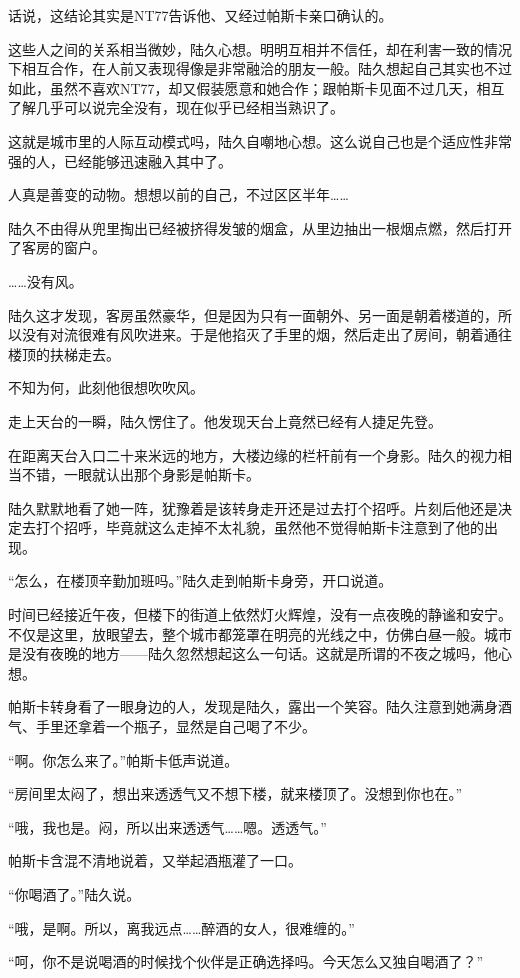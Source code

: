 话说，这结论其实是NT77告诉他、又经过帕斯卡亲口确认的。

这些人之间的关系相当微妙，陆久心想。明明互相并不信任，却在利害一致的情况下相互合作，在人前又表现得像是非常融洽的朋友一般。陆久想起自己其实也不过如此，虽然不喜欢NT77，却又假装愿意和她合作；跟帕斯卡见面不过几天，相互了解几乎可以说完全没有，现在似乎已经相当熟识了。

这就是城市里的人际互动模式吗，陆久自嘲地心想。这么说自己也是个适应性非常强的人，已经能够迅速融入其中了。

人真是善变的动物。想想以前的自己，不过区区半年……

陆久不由得从兜里掏出已经被挤得发皱的烟盒，从里边抽出一根烟点燃，然后打开了客房的窗户。

……没有风。

陆久这才发现，客房虽然豪华，但是因为只有一面朝外、另一面是朝着楼道的，所以没有对流很难有风吹进来。于是他掐灭了手里的烟，然后走出了房间，朝着通往楼顶的扶梯走去。

不知为何，此刻他很想吹吹风。

走上天台的一瞬，陆久愣住了。他发现天台上竟然已经有人捷足先登。

在距离天台入口二十来米远的地方，大楼边缘的栏杆前有一个身影。陆久的视力相当不错，一眼就认出那个身影是帕斯卡。

陆久默默地看了她一阵，犹豫着是该转身走开还是过去打个招呼。片刻后他还是决定去打个招呼，毕竟就这么走掉不太礼貌，虽然他不觉得帕斯卡注意到了他的出现。

“怎么，在楼顶辛勤加班吗。”陆久走到帕斯卡身旁，开口说道。

时间已经接近午夜，但楼下的街道上依然灯火辉煌，没有一点夜晚的静谧和安宁。不仅是这里，放眼望去，整个城市都笼罩在明亮的光线之中，仿佛白昼一般。城市是没有夜晚的地方——陆久忽然想起这么一句话。这就是所谓的不夜之城吗，他心想。

帕斯卡转身看了一眼身边的人，发现是陆久，露出一个笑容。陆久注意到她满身酒气、手里还拿着一个瓶子，显然是自己喝了不少。

“啊。你怎么来了。”帕斯卡低声说道。

“房间里太闷了，想出来透透气又不想下楼，就来楼顶了。没想到你也在。”

“哦，我也是。闷，所以出来透透气……嗯。透透气。”

帕斯卡含混不清地说着，又举起酒瓶灌了一口。

“你喝酒了。”陆久说。

“哦，是啊。所以，离我远点……醉酒的女人，很难缠的。”

“呵，你不是说喝酒的时候找个伙伴是正确选择吗。今天怎么又独自喝酒了？”

